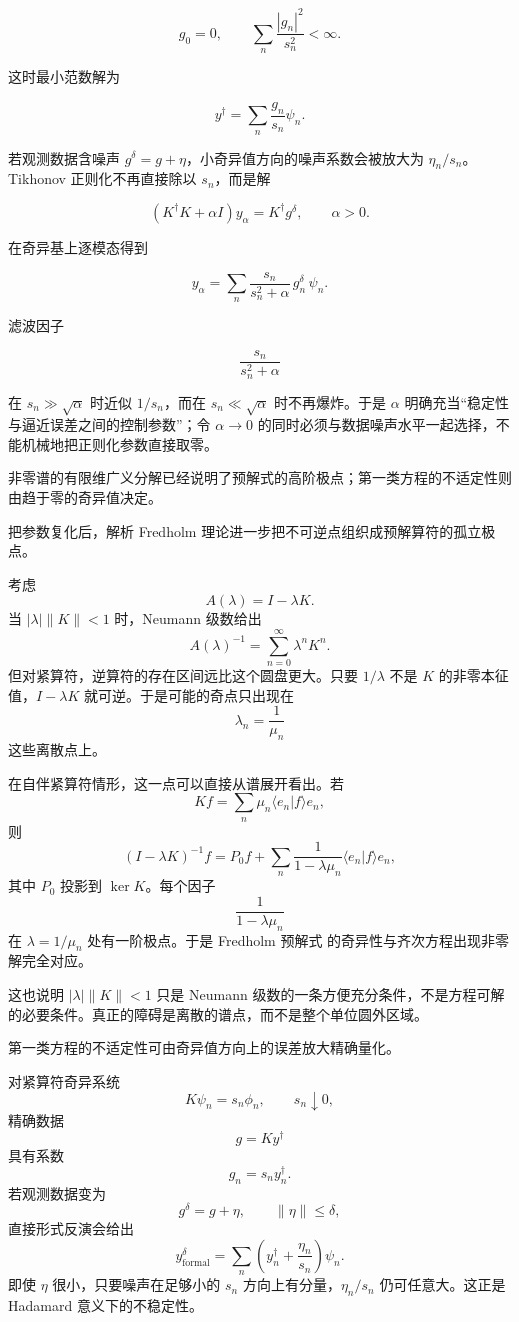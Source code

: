 \begin{equation*}\boxed{
g_0=0,
\qquad
\sum_n\frac{|g_n|^2}{s_n^2}<\infty
}.\end{equation*}

这时最小范数解为

\[
y^\dagger=\sum_n\frac{g_n}{s_n}\psi_n.
\]

若观测数据含噪声 $g^\delta=g+\eta$，小奇异值方向的噪声系数会被放大为 $\eta_n/s_n$。Tikhonov 正则化不再直接除以 $s_n$，而是解

\[
(K^\dagger K+\alpha I)y_\alpha=K^\dagger g^\delta,
\qquad \alpha>0.
\]

在奇异基上逐模态得到

\[
\boxed{
y_\alpha
=\sum_n\frac{s_n}{s_n^2+\alpha}\,g_n^\delta\,\psi_n
}.
\]

滤波因子

\[
\frac{s_n}{s_n^2+\alpha}
\]

在 $s_n\gg\sqrt\alpha$ 时近似 $1/s_n$，而在 $s_n\ll\sqrt\alpha$ 时不再爆炸。于是 $\alpha$ 明确充当``稳定性与逼近误差之间的控制参数''；令 $\alpha\to0$ 的同时必须与数据噪声水平一起选择，不能机械地把正则化参数直接取零。

非零谱的有限维广义分解已经说明了预解式的高阶极点；第一类方程的不适定性则由趋于零的奇异值决定。

把参数复化后，解析 Fredholm 理论进一步把不可逆点组织成预解算符的孤立极点。

考虑
\[
A(\lambda)=I-\lambda K.
\]
当 $|\lambda|\|K\|<1$ 时，Neumann 级数给出
\[
A(\lambda)^{-1}
=\sum_{n=0}^{\infty}\lambda^nK^n.
\]
但对紧算符，逆算符的存在区间远比这个圆盘更大。只要 $1/\lambda$ 不是 $K$ 的非零本征值，$I-\lambda K$ 就可逆。于是可能的奇点只出现在
\[
\lambda_n=\frac1{\mu_n}
\]
这些离散点上。

在自伴紧算符情形，这一点可以直接从谱展开看出。若
\[
Kf=\sum_n\mu_n\langle e_n|f\rangle e_n,
\]
则
\begin{equation*}\boxed{
(I-\lambda K)^{-1}f
=P_0f+
\sum_n\frac{1}{1-\lambda\mu_n}
\langle e_n|f\rangle e_n
},\end{equation*}
其中 $P_0$ 投影到 $\ker K$。每个因子
\[
\frac1{1-\lambda\mu_n}
\]
在 $\lambda=1/\mu_n$ 处有一阶极点。于是 Fredholm 预解式 的奇异性与齐次方程出现非零解完全对应。

这也说明 $|\lambda|\|K\|<1$ 只是 Neumann 级数的一条方便充分条件，不是方程可解的必要条件。真正的障碍是离散的谱点，而不是整个单位圆外区域。

第一类方程的不适定性可由奇异值方向上的误差放大精确量化。

对紧算符奇异系统
\[
K\psi_n=s_n\phi_n,
\qquad s_n\downarrow0,
\]
精确数据
\[
g=Ky^\dagger
\]
具有系数
\[
g_n=s_n y_n^\dagger.
\]
若观测数据变为
\[
g^\delta=g+\eta,
\qquad \|\eta\|\le\delta,
\]
直接形式反演会给出
\[
y_{\mathrm{formal}}^\delta
=\sum_n\left(y_n^\dagger+\frac{\eta_n}{s_n}\right)\psi_n.
\]
即使 $\eta$ 很小，只要噪声在足够小的 $s_n$ 方向上有分量，$\eta_n/s_n$ 仍可任意大。这正是 Hadamard 意义下的不稳定性。

